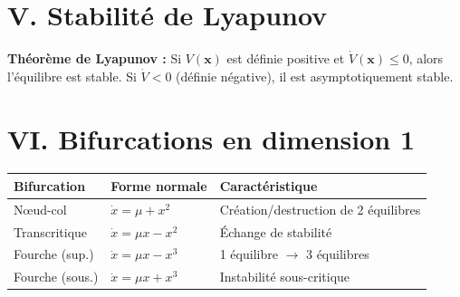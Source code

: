 \documentclass[12pt,a4paper,openany]{book}
\theoremstyle{definition}
\theoremstyle{plain}
\theoremstyle{remark}
\begin{document}
\section*{V. Stabilité de Lyapunov}

\noindent\textbf{Théorème de Lyapunov :} Si $V(\mathbf{x})$ est définie
positive et $\dot{V}(\mathbf{x}) \leq 0$, alors l'équilibre est stable.
Si $\dot{V} < 0$ (définie négative), il est asymptotiquement stable.

\section*{VI. Bifurcations en dimension 1}

\renewcommand{\arraystretch}{1.5}
\begin{center}
\begin{tabular}{p{3.5cm} p{3.5cm} p{6cm}}
\toprule
\textbf{Bifurcation} & \textbf{Forme normale} & \textbf{Caractéristique} \\
\midrule
N\oe ud-col & $\dot{x} = \mu + x^2$ &
Création/destruction de 2 équilibres \\
Transcritique & $\dot{x} = \mu x - x^2$ &
Échange de stabilité \\
Fourche (sup.) & $\dot{x} = \mu x - x^3$ &
1 équilibre $\to$ 3 équilibres \\
Fourche (sous.) & $\dot{x} = \mu x + x^3$ &
Instabilité sous-critique \\
\bottomrule
\end{tabular}
\end{center}

\renewcommand{\arraystretch}{1.0}
\end{document}
